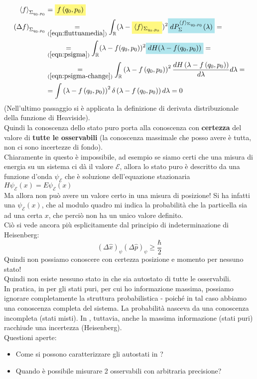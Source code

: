 \documentclass[FisicaTeorica.tex]{subfiles}
\begin{document}
\begin{align*}
\left\langle f\right\rangle_{\Sigma_{q_0,p_0}}&=\hlc{Yellow}{f\left(q_0,p_0\right)}\\
\left(\Delta f\right)_{\Sigma_{q_0,p_0}}&\underset{(\ref{eqn:fluttuamedia})}{=}\int_\bb{R} (\lambda - \hlc{Yellow}{\langle f \rangle_{\Sigma_{q_0,p_0}}})^2 \hlc{SkyBlue}{dP_\Sigma^{\langle f \rangle_{\Sigma_{q_0,p_0}}}(\lambda)} = \\
&\underset{(\ref{eqn:psigma})}{=} \int_\bb{R} (\lambda - f(q_0,p_0))^2 \hlc{SkyBlue}{dH(\lambda- f(q_0,p_0))} =\\
&\underset{(\ref{eqn:psigma-change})}{=}\int_\bb{R} \left(\lambda-f\left(q_0,p_0\right)\right)^2 \frac{dH\left(\lambda-f\left(q_0,p_0\right)\right)}{d\lambda} d\lambda =\\
&=\int\left(\lambda-f\left(q_0,p_0\right)\right)^2\delta\left(\lambda-f\left(q_0,p_0\right)\right)d\lambda=0
\end{align*}
(Nell'ultimo passaggio si è applicata la definizione di derivata distribuzionale della funzione di Heaviside).\\
Quindi la conoscenza dello stato puro porta alla conoscenza con \textbf{certezza} del valore di \textbf{tutte le osservabili} (la conoscenza massimale che posso avere è tutta, non ci sono incertezze di fondo).\\
Chiaramente in \MQ questo è impossibile, ad esempio se siamo certi che una misura di energia su un sistema ci dà il valore $\mathcal{E}$, allora lo stato puro è descritto da una funzione d'onda $\psi_\mathcal{E}$ che è soluzione dell'equazione stazionaria
$H\psi_\mathcal{E}\left(x\right)=E\psi_\mathcal{E}(x)$\\
Ma allora non può avere un valore certo in una misura di posizione! Si ha infatti una $\psi_\mathcal{E}(x)$, che al modulo quadro mi indica la probabilità che la particella sia ad una certa $x$, che perciò non ha un unico valore definito.\\

Ciò si vede ancora più esplicitamente dal principio di indeterminazione di Heisenberg:
\[
\left(\Delta\hat{x}\right)_\psi\left(\Delta\hat{p}\right)_\psi\geq\frac{\hbar}{2}
\]
Quindi non possiamo conoscere con certezza posizione e momento per nessuno stato!\\
Quindi non esiste nessuno stato in \MQ che sia autostato di tutte le osservabili.\\
In pratica, in \MC per gli stati puri, per cui ho informazione massima, possiamo ignorare completamente la struttura probabilistica - poiché in tal caso abbiamo una conoscenza completa del sistema. La probabilità nasceva da una conoscenza incompleta (stati misti).
In \MQ, tuttavia, anche la massima informazione (stati puri) racchiude una incertezza (Heisenberg).\\
Questioni aperte:
\begin{itemize}
    \item Come si possono caratterizzare gli autostati in \MQ?
    \item Quando è possibile misurare 2 osservabili con arbitraria precisione?
\end{itemize}
\end{document}
